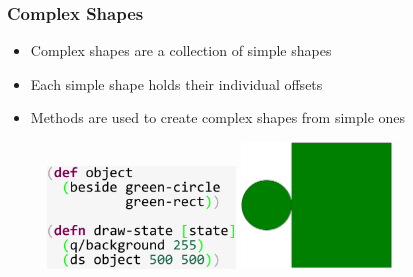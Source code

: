 \documentclass{beamer}
\begin{document}
\begin{frame}
\frametitle{Complex Shapes}
	\begin{itemize}
		\item Complex shapes are a collection of simple shapes
		\item Each simple shape holds their individual offsets
		\item Methods are used to create complex shapes from simple ones
	\end{itemize}
	\begin{figure}
	\includegraphics[width=5cm]{PresentationImages/greenCircleRectangleCode.pdf}
	\hspace{1cm}
	\includegraphics[width=4cm]{PresentationImages/greenCircleRectangle.pdf}
	\end{figure}
\end{frame}
\end{document}
